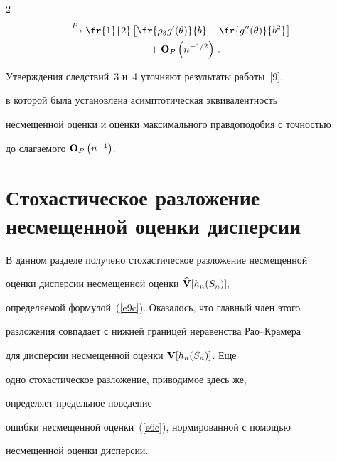 \begin{multicols}{2}
\begin{multline*}
   \stackrel {P}{\longrightarrow} \fr{1}{2}


    \left[\fr{\rho_3g'(\theta)}{b}-\fr{g''(\theta)}{b^2}


    \right]+{}\\


    {}+{\bf O}_P\left(n^{-1/2}\right)\,.


   \end{multline*}





\smallskip





Утверждения следствий~3 и~4 уточняют результаты работы~[9],


   в которой была установлена асимптотическая эквивалентность


   несмещенной оценки и оценки максимального правдоподобия с точностью


   до слагаемого ${\bf O}_P\left( n^{-1}\right)$.





  \section{Стохастическое разложение несмещенной оценки дисперсии}





   В данном разделе получено стохастическое разложение несмещенной


   оценки дисперсии не\-смещенной оценки $\widehat{\bf {V}}[h_n(S_n)],$


   определяемой фор\-мулой~(\ref{e9c}). Оказалось, что главный член этого


   разложения совпадает с нижней границей неравенства Рао--Крамера


   для дисперсии несмещенной оценки ${\bf {V}}[h_n(S_n)]$. Еще


   одно стохастическое разложение, приводимое здесь же,


   определяет предельное поведение


   ошибки несмещенной оценки~(\ref{e6c}), нормированной с помощью


   несмещенной оценки дис\-персии. 





\medskip






\end{multicols}
